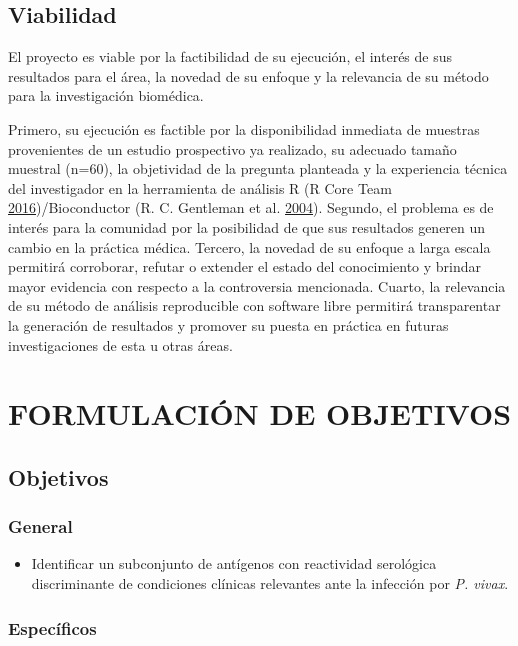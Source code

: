 \documentclass[a4paper]{article}
\providecommand{\tightlist}{%
  \setlength{\itemsep}{0pt}\setlength{\parskip}{0pt}}
\begin{document}
\subsection{Viabilidad}\label{viabilidad}

El proyecto es viable por la factibilidad de su ejecución, el interés de
sus resultados para el área, la novedad de su enfoque y la relevancia de
su método para la investigación biomédica.

Primero, su ejecución es factible por la disponibilidad inmediata de
muestras provenientes de un estudio prospectivo ya realizado, su
adecuado tamaño muestral (n=60), la objetividad de la pregunta planteada
y la experiencia técnica del investigador en la herramienta de análisis
R (R Core Team \protect\hyperlink{ref-R2016}{2016})/Bioconductor (R. C.
Gentleman et al. \protect\hyperlink{ref-bioconductor2004}{2004}).
Segundo, el problema es de interés para la comunidad por la posibilidad
de que sus resultados generen un cambio en la práctica médica. Tercero,
la novedad de su enfoque a larga escala permitirá corroborar, refutar o
extender el estado del conocimiento y brindar mayor evidencia con
respecto a la controversia mencionada. Cuarto, la relevancia de su
método de análisis reproducible con software libre permitirá
transparentar la generación de resultados y promover su puesta en
práctica en futuras investigaciones de esta u otras áreas.

\section{FORMULACIÓN DE OBJETIVOS}\label{formulacion-de-objetivos}

\subsection{Objetivos}\label{objetivos}

\subsubsection{General}\label{general}

\begin{itemize}
\tightlist
\item
  Identificar un subconjunto de antígenos con reactividad serológica
  discriminante de condiciones clínicas relevantes ante la infección por
  \emph{P. vivax}.
\end{itemize}

\subsubsection{Específicos}\label{especificos}
\end{document}
